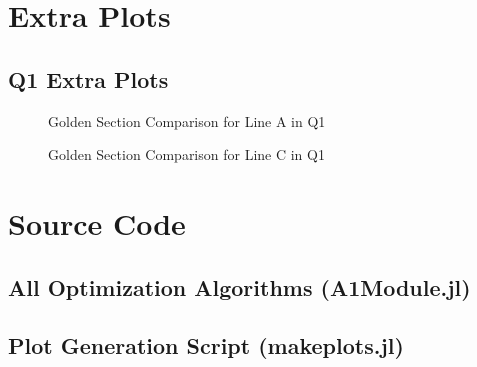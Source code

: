\documentclass{article}
\begin{document}
    \appendix
    \section{Extra Plots}

    \subsection{Q1 Extra Plots}

    \begin{figure}[H]
        \centering
        
        \caption{Golden Section Comparison for Line A in Q1}
    \end{figure}
    
    \begin{figure}[H]
        \centering
        
        \caption{Golden Section Comparison for Line C in Q1}
    \end{figure}

    \section{Source Code}

    \subsection{All Optimization Algorithms (A1Module.jl)}


    \subsection{Plot Generation Script (makeplots.jl)}


    
\end{document}
